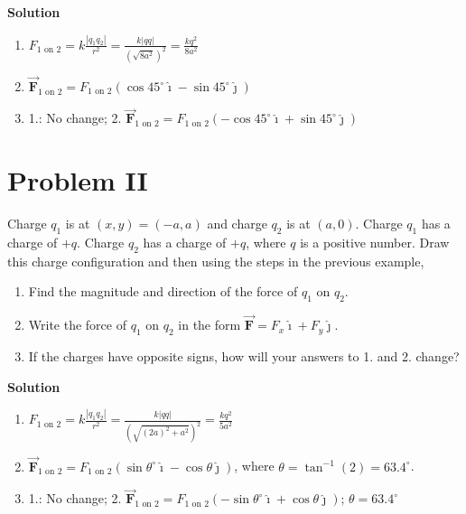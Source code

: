 \documentclass{article}
\renewcommand{\mbox}{\text}
\newcommand{\ds}[0]{\displaystyle}
\newcommand{\ihat}[0]{\hat{\boldsymbol{\imath}}}
\newcommand{\jhat}[0]{\hat{\boldsymbol{\jmath}}}
\newcommand{\bfvec}[1]{\vec{\mathbf{#1}}}
\begin{document}


\ifsolutions
{\bf Solution}

    \begin{enumerate}

      \item $\ds F_{1\mbox{ on } 2}=k\frac{|q_1q_2|}{r^2}=\frac{k|qq|}{(\sqrt{8a^2})^2}=\frac{kq^2}{8a^2}$

      \item $\bfvec{F}_{1\mbox{ on } 2} = F_{1\mbox{ on } 2}(\cos 45^\circ \ihat - \sin 45^\circ \jhat)$

      \item 1.: No change; 2. $\bfvec{F}_{1\mbox{ on } 2} = F_{1\mbox{ on } 2}(-\cos 45^\circ \ihat + \sin 45^\circ \jhat)$

    \end{enumerate}
\else

\newpage
\fi
\ifsolutions\else
\newpage
\fi

\section{Problem II}

Charge $q_1$ is at $(x,y)=(-a,a)$ and charge $q_2$ is at $(a, 0)$. Charge $q_1$ has a charge of $+q$. Charge $q_2$ has a charge of $+q$, where $q$ is a positive number. Draw this charge configuration and then using the steps in the previous example,

\begin{enumerate}

  \item Find the magnitude and direction of the force of $q_1$ on $q_2$.

  \item Write the force of $q_1$ on $q_2$ in the form $\bfvec{F}=F_x\ihat + F_y\jhat$.

  \item If the charges have opposite signs, how will your answers to 1. and 2. change?

\end{enumerate}



\ifsolutions
{\bf Solution}



    \begin{enumerate}

      \item $\ds F_{1\mbox{ on } 2}=k\frac{|q_1q_2|}{r^2}=\frac{k|qq|}{(\sqrt{(2a)^2+a^2})^2}=\frac{kq^2}{5a^2}$

      \item $\bfvec{F}_{1\mbox{ on } 2} = F_{1\mbox{ on } 2}(\sin \theta^\circ \ihat - \cos \theta\jhat)$, where $\theta=\tan^{-1}(2) = 63.4^\circ$.

      \item 1.: No change; 2. $\bfvec{F}_{1\mbox{ on } 2} = F_{1\mbox{ on } 2}(-\sin \theta^\circ \ihat + \cos \theta\jhat)$; $\theta=63.4^\circ$

    \end{enumerate}
\fi
\end{document}
